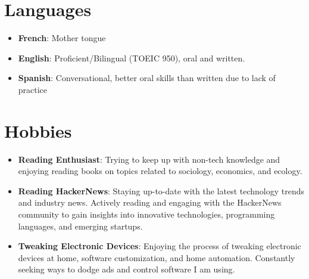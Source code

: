 \documentclass[letterpaper,11pt]{article}
\newcommand{\resumeItem}[2]{
  \item\small{
    \textbf{#1}{: #2 \vspace{-2pt}}
  }
}
\newcommand{\resumeSubItem}[2]{\resumeItem{#1}{#2}\vspace{-4pt}}
\newcommand{\resumeSubHeadingListStart}{\begin{itemize}[leftmargin=*]}
\newcommand{\resumeSubHeadingListEnd}{\end{itemize}}
\begin{document}
\section{Languages}
 \resumeSubHeadingListStart
   \item{
     \textbf{French}{: Mother tongue}}
     \item{
     \textbf{English}{: Proficient/Bilingual (TOEIC 950), oral and written.}
     }
     \item{
     \textbf{Spanish}{: Conversational, better oral skills than written due to lack of practice}
     }
 \resumeSubHeadingListEnd

\section{Hobbies}
\resumeSubHeadingListStart
\resumeItem{Reading Enthusiast}
{Trying to keep up with non-tech knowledge and enjoying reading books on topics related to sociology, economics, and ecology.}
\resumeSubItem{Reading HackerNews}
{Staying up-to-date with the latest technology trends and industry news. Actively reading and engaging with the HackerNews community to gain insights into innovative technologies, programming languages, and emerging startups.}
\resumeSubItem{Tweaking Electronic Devices}
{Enjoying the process of tweaking electronic devices at home, software customization, and home automation. Constantly seeking ways to dodge ads and control software I am using.}
\resumeSubHeadingListEnd
\end{document}
